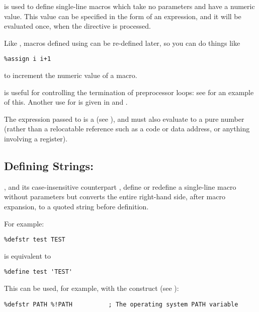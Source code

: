  is used to define single-line macros which take no
parameters and have a numeric value. This value can be specified in
the form of an expression, and it will be evaluated once, when the
 directive is processed.

Like , macros defined using  can be
re-defined later, so you can do things like

\begin{lstlisting}
%assign i i+1
\end{lstlisting}

to increment the numeric value of a macro.

 is useful for controlling the termination of 
preprocessor loops: see  for an example of this. Another
use for  is given in  and
.

The expression passed to  is a 
(see ), and must also evaluate to a pure number
(rather than a relocatable reference such as a code or data address,
or anything involving a register).

\subsection{Defining Strings: }
\label{subsec:defstr}

, and its case-insensitive counterpart ,
define or redefine a single-line macro without parameters but converts
the entire right-hand side, after macro expansion, to a quoted string
before definition.

For example:

\begin{lstlisting}
%defstr test TEST
\end{lstlisting}

is equivalent to

\begin{lstlisting}
%define test 'TEST'
\end{lstlisting}

This can be used, for example, with the \code{\%!} construct
(see ):

\begin{lstlisting}
%defstr PATH %!PATH          ; The operating system PATH variable
\end{lstlisting}

